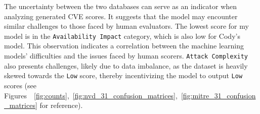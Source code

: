 \documentclass[12pt]{article}
\begin{document}
The uncertainty between the two databases can serve as an indicator when analyzing generated CVE
scores. It suggests that the model may encounter similar challenges to those faced by human
evaluators. The lowest score for my model is in the \texttt{Availability Impact} category, which is also low
for Cody's model. This observation indicates a correlation between the machine learning models'
difficulties and the issues faced by human scorers. \texttt{Attack Complexity} also presents challenges,
likely due to data imbalance, as the dataset is heavily skewed towards the \texttt{Low} score,
thereby incentivizing the model to output \texttt{Low} scores (see
Figures~~\ref{fig:counts},~\ref{fig:nvd_31_confusion_matrices},~\ref{fig:mitre_31_confusion_matrices}
for reference).

\begin{table}[H]
	\centering
	\caption{Comparison of the effects of the pre-trained models on the CVSS v3.1 dataset (Part 1).}
	\label{tab:distil_part1}
\end{table}
\end{document}
